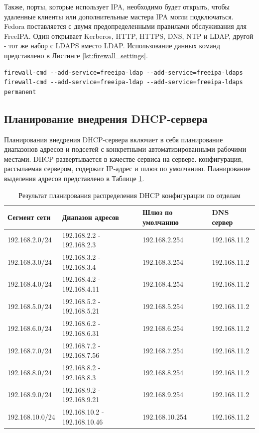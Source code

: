 \documentclass[14pt, a4paper]{extarticle}
\numberwithin{equation}{section}
\begin{document}
Также, порты, которые использует IPA, необходимо будет 
открыть, чтобы удаленные клиенты или дополнительные мастера IPA могли подключаться. 
Fedora поставляется с двумя предопределенными правилами обслуживания для FreeIPA. 
Один открывает Kerberos, HTTP, HTTPS, DNS, NTP и LDAP, другой - тот же набор с LDAPS вместо LDAP. 
Использование данных команд представлено в Листинге \ref{lst:firewall_settings}. 
\begin{lstlisting}[caption={Команды брандмауэра\label{lst:firewall_settings}}]
firewall-cmd --add-service=freeipa-ldap --add-service=freeipa-ldaps 
firewall-cmd --add-service=freeipa-ldap --add-service=freeipa-ldaps permanent 
\end{lstlisting}


\newpage
\subsection{Планирование внедрения DHCP-сервера}
Планирования внедрения DHCP-сервера включает в себя планирование 
диапазонов адресов и подсетей с конкретными автоматизированными рабочими местами.
DHCP развертывается в качестве сервиса на сервере. 
конфигурация, рассылаемая сервером, содержит IP-адрес и шлюз по умолчанию.
Планирование выделения адресов представлено в Таблице \ref{table:dhcp_plan}.

\begin{table}[H]
\centering
\small
\caption{Результат планирования распределения DHCP конфигурации по отделам}
\label{table:dhcp_plan}
\begin{tabular}{|l|l|m{2.5cm}|m{2.5cm}|}
\hline
\textbf{Сегмент сети} & \textbf{Диапазон адресов} & \textbf{Шлюз по умолчанию} & \textbf{DNS сервер}\\
\hline
192.168.2.0/24 & 192.168.2.2 - 192.168.2.3 & 192.168.2.254  & 192.168.11.2\\
\hline
192.168.3.0/24 & 192.168.3.2 - 192.168.3.4 & 192.168.3.254 & 192.168.11.2\\
\hline
192.168.4.0/24 & 192.168.4.2 - 192.168.4.11 & 192.168.4.254 & 192.168.11.2\\
\hline
192.168.5.0/24 & 192.168.5.2 - 192.168.5.21 & 192.168.5.254 & 192.168.11.2\\
\hline
192.168.6.0/24 & 192.168.6.2 - 192.168.6.31 & 192.168.6.254 & 192.168.11.2\\
\hline
192.168.7.0/24 & 192.168.7.2 - 192.168.7.56 & 192.168.7.254 & 192.168.11.2\\
\hline
192.168.8.0/24 & 192.168.8.2 - 192.168.8.3 & 192.168.8.254 & 192.168.11.2\\
\hline
192.168.9.0/24 & 192.168.9.2 - 192.168.9.21 & 192.168.9.254 & 192.168.11.2 \\
\hline
192.168.10.0/24 & 192.168.10.2 - 192.168.10.46 & 192.168.10.254 & 192.168.11.2\\
\hline
\end{tabular}
\end{table}
\end{document}
